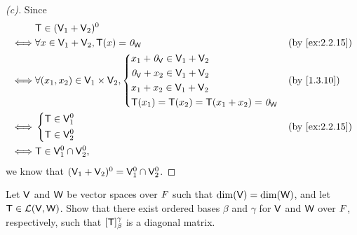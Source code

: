 \begin{proof}[(c)]
  Since
  \begin{align*}
         & \T \in (\V_1 + \V_2)^0                                                               \\
    \iff & \forall x \in \V_1 + \V_2, \T(x) = \zv_{\W}             &  & \by{ex:2.2.15}          \\
    \iff & \forall (x_1, x_2) \in \V_1 \times \V_2, \begin{dcases}
                                                      x_1 + \zv_{\V} \in \V_1 + \V_2 \\
                                                      \zv_{\V} + x_2 \in \V_1 + \V_2 \\
                                                      x_1 + x_2 \in \V_1 + \V_2      \\
                                                      \T(x_1) = \T(x_2) = \T(x_1 + x_2) = \zv_{\W}
                                                    \end{dcases} &  & \by{1.3.10} \\
    \iff & \begin{dcases}
             \T \in \V_1^0 \\
             \T \in \V_2^0
           \end{dcases}                                        &  & \by{ex:2.2.15}              \\
    \iff & \T \in \V_1^0 \cap \V_2^0,
  \end{align*}
  we know that \((\mathsf{V}_1 + \mathsf{V}_2)^0 = \mathsf{V}_1^0 \cap \mathsf{V}_2^0\).
\end{proof}

\begin{ex}\label{ex:2.2.16}
  Let \(\mathsf{V}\) and \(\mathsf{W}\) be vector spaces over \(\mathit{F}\) such that \(\dim(\mathsf{V}) = \dim(\mathsf{W})\), and let \(\mathsf{T} \in \mathcal{L}(\mathsf{V}, \mathsf{W})\).
  Show that there exist ordered bases \(\beta\) and \(\gamma\) for \(\mathsf{V}\) and \(\mathsf{W}\) over \(\mathit{F}\), respectively, such that \([\mathsf{T}]_{\beta}^{\gamma}\) is a diagonal matrix.
\end{ex}

